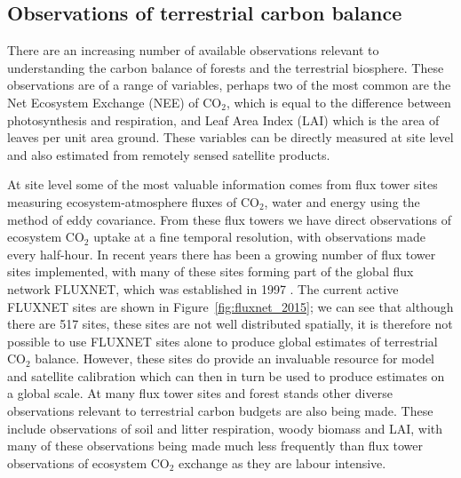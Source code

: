 

\subsection{Observations of terrestrial carbon balance}

There are an increasing number of available observations relevant to understanding the carbon balance of forests and the terrestrial biosphere. These observations are of a range of variables, perhaps two of the most common are the Net Ecosystem Exchange (NEE) of CO\(_{2}\), which is equal to the difference between photosynthesis and respiration, and Leaf Area Index (LAI) which is the area of leaves per unit area ground. These variables can be directly measured at site level and also estimated from remotely sensed satellite products.

At site level some of the most valuable information comes from flux tower sites measuring ecosystem-atmosphere fluxes of CO\(_{2}\), water and energy using the method of eddy covariance. From these flux towers we have direct observations of ecosystem CO\(_{2}\) uptake at a fine temporal resolution, with observations made every half-hour. In recent years there has been a growing number of flux tower sites implemented, with many of these sites forming part of the global flux network FLUXNET, which was established in 1997 \citep{baldocchi2001fluxnet}. The current active FLUXNET sites are shown in Figure~\ref{fig:fluxnet_2015}; we can see that although there are 517 sites, these sites are not well distributed spatially, it is therefore not possible to use FLUXNET sites alone to produce global estimates of terrestrial CO\(_{2}\) balance. However, these sites do provide an invaluable resource for model and satellite calibration which can then in turn be used to produce estimates on a global scale. At many flux tower sites and forest stands other diverse observations relevant to terrestrial carbon budgets are also being made. These include observations of soil and litter respiration, woody biomass and LAI, with many of these observations being made much less frequently than flux tower observations of ecosystem CO\(_{2}\) exchange as they are labour intensive.     

